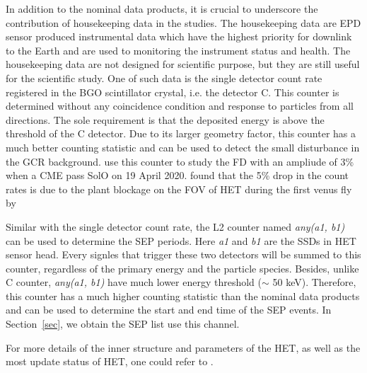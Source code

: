 In addition to the nominal data products, it is crucial to underscore the contribution of housekeeping data in the studies.
The housekeeping data are EPD sensor produced instrumental data which have the highest priority for downlink to the Earth and are used to monitoring the instrument status and health. The housekeeping data are not designed for scientific purpose, but they are still useful for the scientific study. 
One of such data is the single detector count rate registered in the BGO scintillator crystal, i.e. the detector C. This counter is determined without any coincidence condition and response to particles from all directions. The sole requirement is that the deposited energy is above the threshold of the C detector. Due to its larger geometry factor, this counter has a much better counting statistic and can be used to detect the small disturbance in the \ac{GCR} background. \citep{Forstner-2021-SolO} use this counter to study the \ac{FD} with an ampliude of 3\% when a \ac{CME} pass \ac{SolO} on 19 April 2020. 
\citep{Allen-2021-SolOVenue} found that the 5\% drop in the count rates is due to the plant blockage on the \ac{FOV} of \ac{HET} during the first venus fly by

Similar with the single detector count rate, the L2 counter named \textit{any(a1, b1)} can be used to determine the \ac{SEP} periods. Here \textit{a1} and \textit{b1} are the \acp{SSD} in HET sensor head. Every signles that trigger these two detectors will be summed to this counter, regardless of the primary energy and the particle species. Besides, unlike C counter, \textit{any(a1, b1)} have much lower energy threshold ($\sim$ 50 keV). Therefore, this counter has a much higher counting statistic than the nominal data products and can be used to determine the start and end time of the \ac{SEP} events. In Section~\ref{sec}, we obtain the \ac{SEP} list use this channel.

For more details of the inner structure and parameters of the HET, as well as the most update status of HET, one could refer to \citep{2020AA_EPD, wimmer2021AA,Elftmann-2020-PhD}.

